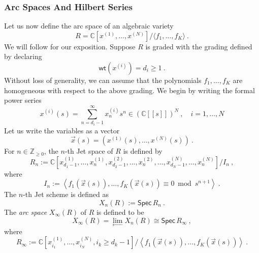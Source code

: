\documentclass[a4paper,10pt]{article}
\newcommand{\C}{\mathds{C}}
\newcommand{\mr}[1]{\mathsf{#1}}
\begin{document}
\subsubsection{Arc Spaces And Hilbert Series}
Let us now define the arc space of an algebraic variety
\begin{equation}\label{eq:variety_R}
    R=\C[x^{(1)},\dots,x^{(N)}]/\langle f_1,\dots,f_K\rangle~.
\end{equation}
We will follow \cite{bruschek2011arc} for our exposition. 
Suppose $R$ is graded with the grading defined by declaring 
\begin{equation}
    \mr{wt}(x^{(i)})=d_i\geq 1~.
\end{equation}
Without loss of generality, we can assume that the polynomials $f_1,\dots,f_K$ are homogeneous with respect to the above grading. We begin by writing the formal power series
\begin{equation}
    x^{(i)}(s)=\sum_{n=d_i-1}^\infty x^{(i)}_ns^n\in\left(\C[[s]]\right)^N~,\quad i=1,\dots,N
\end{equation}
Let us write the variables as a vector 
\begin{equation}
\vec{x}(s)=\left(x^{(1)}(s),\dots,x^{(N)}(s)\right)~.    
\end{equation}
For $n\in\mathds{Z}_{\geq 0}$, the $n$-th Jet space of $R$ is defined by
\begin{equation}
    R_n:=\C[x^{(1)}_{d_1-1},\dots,x^{(1)}_n,x^{(2)}_{d_2-1},\dots,x^{(2)}_n,\dots,x^{(N)}_{d_N-1},\dots,x^{(N)}_n]/I_n~,
\end{equation}
where 
\begin{equation}
    I_n:=\left\langle f_1(\vec{x}(s)),\dots,f_K(\vec{x}(s))\equiv 0\bmod s^{n+1}\right\rangle~.
\end{equation}
The $n$-th Jet scheme is defined as 
\begin{equation}
    X_n(R):=\mr{Spec}\,R_n~.
\end{equation}
The \textit{arc space} $X_\infty(R)$ of $R$ is defined to be 
\begin{equation}
X_\infty(R)=\lim_{\leftarrow}X_n(R)\cong\mr{Spec}\,R_\infty~,     
\end{equation}
where 
\begin{equation}
 R_\infty:=\C[x^{(1)}_{i_1},\dots,x^{(N)}_{i_N},i_k\geq d_{k}-1]/\left\langle f_1(\vec{x}(s)),\dots,f_K(\vec{x}(s))\right\rangle~.   
\end{equation}
\end{document}
